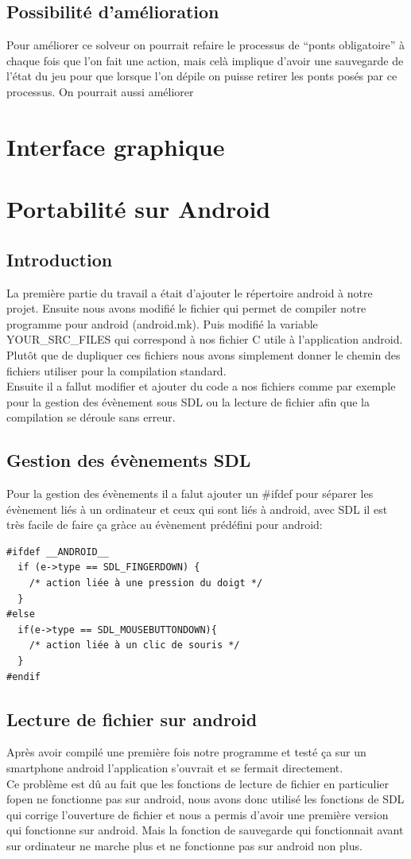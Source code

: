 \documentclass[12pt]{report}
\begin{document}
\section{Possibilité d'amélioration}
Pour améliorer ce solveur on pourrait refaire le processus de ``ponts obligatoire'' à chaque fois que l'on fait une action, mais celà implique d'avoir une sauvegarde de l'état du jeu pour que lorsque l'on dépile on puisse retirer les ponts posés par ce processus. On pourrait aussi améliorer 

\newpage
\chapter{Interface graphique}
\newpage
\chapter{Portabilité sur Android}
\section{Introduction}
\textnormal{La première partie du travail a était d'ajouter le répertoire android à notre projet. Ensuite nous avons modifié le fichier qui permet de compiler notre programme pour android (android.mk). Puis modifié la variable YOUR\_SRC\_FILES qui correspond à nos fichier C utile à l'application android. Plutôt que de dupliquer ces fichiers nous avons simplement donner le chemin des fichiers utiliser pour la compilation standard.\\Ensuite il a fallut modifier et ajouter du code a nos fichiers comme par exemple pour la gestion des évènement sous SDL ou la lecture de fichier afin que la compilation se déroule sans erreur.}
\section{Gestion des évènements SDL}
\textnormal{Pour la gestion des évènements il a falut ajouter un \#ifdef pour séparer les évènement liés à un ordinateur et ceux qui sont liés à android, avec SDL il est très facile de faire ça gràce au évènement prédéfini pour android:}
\begin{verbatim}
#ifdef __ANDROID__
  if (e->type == SDL_FINGERDOWN) {
    /* action liée à une pression du doigt */
  }
#else
  if(e->type == SDL_MOUSEBUTTONDOWN){
    /* action liée à un clic de souris */
  }
#endif
\end{verbatim}
\section{Lecture de fichier sur android}
\textnormal{Après avoir compilé une première fois notre programme et testé ça sur un smartphone android l'application s'ouvrait et se fermait directement.\\Ce problème est dû au fait que les fonctions de lecture de fichier en particulier fopen ne fonctionne pas sur android, nous avons donc utilisé les fonctions de SDL qui corrige l'ouverture de fichier et nous a permis d'avoir une première version qui fonctionne sur android. Mais la fonction de sauvegarde qui fonctionnait avant sur ordinateur ne marche plus et ne fonctionne pas sur android non plus.}
\end{document}
